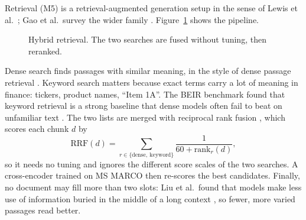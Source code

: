 \documentclass[11pt,a4paper]{article}
\newcommand{\code}[1]{\texttt{#1}}
\begin{document}
Retrieval (M5) is a retrieval-augmented generation setup in the sense of Lewis et al.\
\cite{lewis2020retrievalaugmented}; Gao et al.\ survey the wider family \cite{gao2023retrievalaugmented}.
Figure~\ref{fig:retrieval} shows the pipeline.

\begin{figure}[htbp]
\centering
{}
\caption{Hybrid retrieval. The two searches are fused without tuning, then reranked.}
\label{fig:retrieval}
\end{figure}

Dense search finds passages with similar meaning, in the style of dense passage retrieval
\cite{karpukhin2020dense}. Keyword search matters because exact terms carry a lot of meaning in finance:
tickers, product names, ``Item 1A''. The BEIR benchmark found that keyword retrieval is a strong baseline
that dense models often fail to beat on unfamiliar text \cite{thakur2021beir}. The two lists are merged
with reciprocal rank fusion \cite{cormack2009rrf}, which scores each chunk $d$ by
\begin{equation}
  \mathrm{RRF}(d) = \sum_{r \in \{\text{dense},\ \text{keyword}\}} \frac{1}{60 + \mathrm{rank}_r(d)},
\end{equation}
so it needs no tuning and ignores the different score scales of the two searches. A cross-encoder
trained on MS MARCO \cite{nogueira2019passage, bajaj2016marco} then re-scores the best candidates. Finally,
no document may fill more than two slots: Liu et al.\ found that models make less use of information buried
in the middle of a long context \cite{liu2023lost}, so fewer, more varied passages read better.
\end{document}
